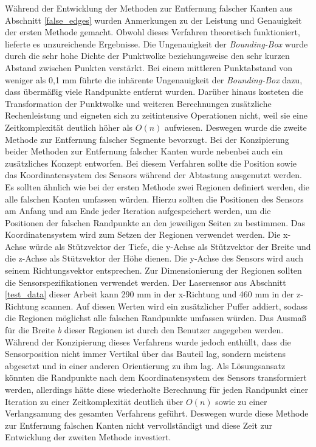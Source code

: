 Während der Entwicklung der Methoden zur Entfernung falscher Kanten aus Abschnitt \ref{false_edges} wurden Anmerkungen zu der Leistung und Genauigkeit der ersten Methode gemacht. Obwohl dieses Verfahren theoretisch funktioniert, lieferte es unzureichende Ergebnisse. Die Ungenauigkeit der \textit{Bounding-Box} wurde durch die sehr hohe Dichte der Punktwolke beziehungsweise den sehr kurzen Abstand zwischen Punkten verstärkt. Bei einem mittleren Punktabstand von weniger als 0,1 mm führte die inhärente Ungenauigkeit der \textit{Bounding-Box} dazu, dass übermäßig viele Randpunkte entfernt wurden. Darüber hinaus kosteten die Transformation der Punktwolke und weiteren Berechnungen zusätzliche Rechenleistung und eigneten sich zu zeitintensive Operationen nicht, weil sie eine Zeitkomplexität deutlich höher als $O(n)$ aufwiesen. Deswegen wurde die zweite Methode zur Entfernung falscher Segmente bevorzugt. Bei der Konzipierung beider Methoden zur Entfernung falscher Kanten wurde nebenbei auch ein zusätzliches Konzept entworfen. Bei diesem Verfahren sollte die Position sowie das Koordinatensystem des Sensors während der Abtastung ausgenutzt werden. Es sollten ähnlich wie bei der ersten Methode zwei Regionen definiert werden, die alle falschen Kanten umfassen würden. Hierzu sollten die Positionen des Sensors am Anfang und am Ende jeder Iteration aufgespeichert werden, um die Positionen der falschen Randpunkte an den jeweiligen Seiten zu bestimmen. Das Koordinatensystem wird zum Setzen der Regionen verwendet werden. Die x-Achse würde als Stützvektor der Tiefe, die y-Achse als Stützvektor der Breite und die z-Achse als Stützvektor der Höhe dienen. Die y-Achse des Sensors wird auch seinem Richtungsvektor entsprechen. Zur Dimensionierung der Regionen sollten die Sensorspezifikationen verwendet werden. Der Lasersensor aus Abschnitt \ref{test_data} dieser Arbeit kann 290 mm in der x-Richtung und 460 mm in der z-Richtung scannen. Auf diesen Werten wird ein zusätzlicher Puffer addiert, sodass die Regionen möglichst alle falschen Randpunkte umfassen würden. Das Ausmaß für die Breite \textit{b} dieser Regionen ist durch den Benutzer angegeben werden. Während der Konzipierung dieses Verfahrens wurde jedoch enthüllt, dass die Sensorposition nicht immer Vertikal über das Bauteil lag, sondern meistens abgesetzt und in einer anderen Orientierung zu ihm lag. Als Lösungsansatz könnten die Randpunkte nach dem Koordinatensystem des Sensors transformiert werden, allerdings hätte diese wiederholte Berechnung für jeden Randpunkt einer Iteration zu einer Zeitkomplexität deutlich über $O(n)$ sowie zu einer Verlangsamung des gesamten Verfahrens geführt. Deswegen wurde diese Methode zur Entfernung falschen Kanten nicht vervollständigt und diese Zeit zur Entwicklung der zweiten Methode investiert. 

